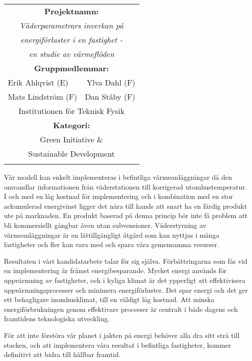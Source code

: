 \documentclass[11pt,a4paper]{article}
\begin{document}
\begin{multicols}{2}
\renewcommand{\arraystretch}{1.2}
\noindent
\resizebox{8cm}{!} {
\begin{tabular}{l r}
\hline
\multicolumn{2}{|c|}{\cellcolor{YellowGreen} \textbf{Projektnamn:}}\\[3pt]
\multicolumn{2}{|c|}{\cellcolor{YellowGreen} \textit{Väderparametrars inverkan på}}\\
\multicolumn{2}{|c|}{\cellcolor{YellowGreen} \textit{energiförluster i en fastighet -}}\\
\multicolumn{2}{|c|}{\cellcolor{YellowGreen} \textit{en studie av värmeflöden}}\\
\multicolumn{2}{|c|}{\cellcolor{YellowGreen} \textbf{Gruppmedlemmar:}} \\[3pt]
\multicolumn{1}{|l}{\cellcolor{YellowGreen} Erik Ahlqvist (E)} & \multicolumn{1}{r|}{\cellcolor{YellowGreen} Ylva Dahl (F)}\\
\multicolumn{1}{|l}{\cellcolor{YellowGreen} Mats Lindström (F)} & \multicolumn{1}{r|}{\cellcolor{YellowGreen} Dan Ståby (F)}\\
\multicolumn{2}{|c|}{\cellcolor{YellowGreen} Institutionen för Teknisk Fysik} \\
\multicolumn{2}{|c|}{\cellcolor{YellowGreen} \textbf{Kategori:}} \\[3pt]
\multicolumn{2}{|c|}{\cellcolor{YellowGreen} Green Initiative \&}\\
\multicolumn{2}{|c|}{\cellcolor{YellowGreen} Sustainable Development}\\
\hline
& \\
\end{tabular}
}

Vår modell kan enkelt implementeras i befintliga värmeanläggningar då den omvandlar informationen från väderstationen till korrigerad utomhustemperatur. I och med en låg kostnad för implementering och i kombination med en stor ackumulerad energivinst ligger det nära till hands att snart ha en färdig produkt ute på marknaden. 
En produkt baserad på denna princip bör inte få problem att bli kommersiellt gångbar även utan subvensioner. Väderstyrning av värmeanläggningar är en lättillgängligt åtgärd som kan nyttjas i många fastigheter och fler kan vara med och spara våra gemensamma resurser. 

Resultaten i vårt kandidatarbete talar för sig själva. Förbättringarna som fås vid en implementering är främst energibesparande. Mycket energi används för uppvärmning av fastigheter, och i kyliga klimat är det ypperligt att effektivisera uppvärmningsprocesser och minimera energiförluster. Det spar energi och det ger ett behagligare inomhusklimat, till en väldigt låg kostnad. Att minska energiförbrukningen genom effektivare processer är centralt i både dagens och framtidens teknologiska utveckling. 

För att inte förstöra vår planet i jakten på energi behöver alla dra sitt strå till stacken, och att implementera våra resultat i befintliga fastigheter, kommer definitivt att bidra till hållbar framtid.

\end{multicols}
\end{document}
